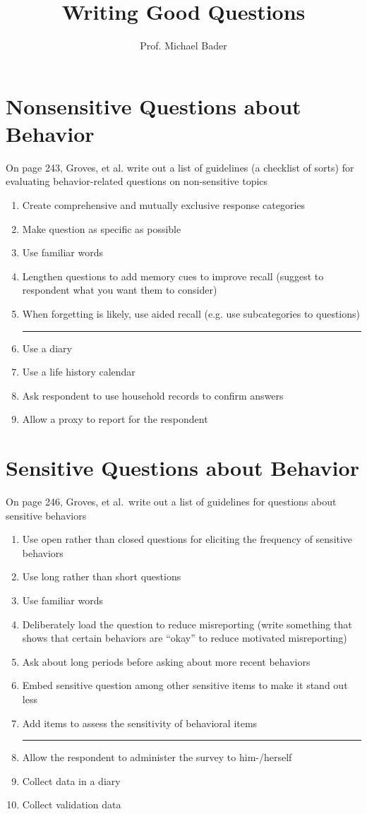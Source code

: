 \documentclass[11pt]{homework}
\title{Writing Good Questions}
\author{Prof. Michael Bader}
\begin{document}
\maketitle 

\section{Nonsensitive Questions about Behavior}
On page 243, Groves, et al. write out a list of guidelines (a checklist of sorts) for evaluating behavior-related questions on non-sensitive topics

\begin{enumerate}[noitemsep]
\item Create comprehensive and mutually exclusive response categories
\item Make question as specific as possible
\item Use familiar words
\item Lengthen questions to add memory cues to improve recall (suggest to respondent what you want them to consider)
\item When forgetting is likely, use aided recall (e.g. use subcategories to questions)\hrule\vspace{.3em}
\item Use a diary
\item Use a life history calendar
\item Ask respondent to use household records to confirm answers
\item Allow a proxy to report for the respondent
\end{enumerate}

\section{Sensitive Questions about Behavior}
On page 246, Groves, et al.\ write out a list of guidelines for questions about sensitive behaviors

\begin{enumerate}[noitemsep]
\item Use open rather than closed questions for eliciting the frequency of sensitive behaviors
\item Use long rather than short questions
\item Use familiar words
\item Deliberately load the question to reduce misreporting (write something that shows that certain behaviors are ``okay'' to reduce motivated misreporting)
\item Ask about long periods before asking about more recent behaviors
\item Embed sensitive question among other sensitive items to make it stand out less
\item Add items to assess the sensitivity of behavioral items
\hrule\vspace{.3em}
\item Allow the respondent to administer the survey to him-\slash herself 
\item Collect data in a diary
\item Collect validation data 
\end{enumerate}
\end{document}
